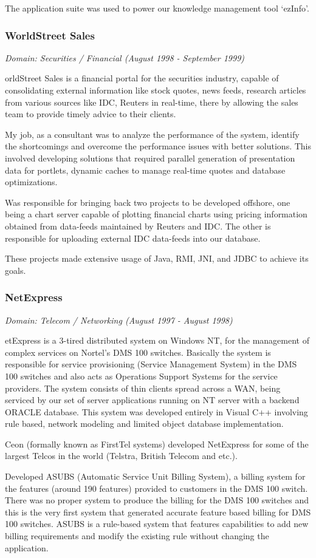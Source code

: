 \documentclass[a4paper,12pt]{article}
\newcommand\cvprojectentry[5]{
  \subsubsection*{#1}
  
  \vspace{-7pt}
  
  \it{Domain: #2}\normalfont{} \quad (#3 - #4)
  
}
\begin{document}
The application suite was used to power our knowledge management tool
`ezInfo'.
 
\cvprojectentry{WorldStreet Sales}{Securities / Financial}{August 1998}{September 1999}

 
WorldStreet Sales is a financial portal for the securities industry,
capable of consolidating external information like stock quotes, news
feeds, research articles from various sources like IDC, Reuters in
real-time, there by allowing the sales team to provide timely advice to
their clients.
 
My job, as a consultant was to analyze the performance of the system,
identify the shortcomings and overcome the performance issues with
better solutions. This involved developing solutions that required
parallel generation of presentation data for portlets, dynamic caches
to manage real-time quotes and database optimizations.
 
Was responsible for bringing back two projects to be developed
offshore, one being a chart server capable of plotting financial
charts using pricing information obtained from data-feeds maintained
by Reuters and IDC. The other is responsible for uploading external
IDC data-feeds into our database.
 
These projects made extensive usage of Java, RMI, JNI, and JDBC to
achieve its goals.
 
\cvprojectentry{NetExpress}{Telecom / Networking}{August 1997}{August 1998}

NetExpress is a 3-tired distributed system on Windows NT, for the
management of complex services on Nortel’s DMS 100 switches. Basically
the system is responsible for service provisioning (Service Management
System) in the DMS 100 switches and also acts as Operations Support
Systems for the service providers. The system consists of thin clients
spread across a WAN, being serviced by our set of server applications
running on NT server with a backend ORACLE database. This system was
developed entirely in Visual C++ involving rule based, network
modeling and limited object database implementation.
 
Ceon (formally known as FirstTel systems) developed NetExpress for
some of the largest Telcos in the world (Telstra, British Telecom and
etc.).
 
Developed ASUBS (Automatic Service Unit Billing System), a billing
system for the features (around 190 features) provided to customers in
the DMS 100 switch. There was no proper system to produce the billing
for the DMS 100 switches and this is the very first system that
generated accurate feature based billing for DMS 100 switches. ASUBS
is a rule-based system that features capabilities to add new billing
requirements and modify the existing rule without changing the
application.
 
\end{document}
